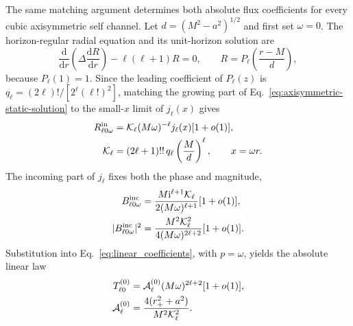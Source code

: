 \documentclass[aps,prd,twocolumn,10pt,nofootinbib,superscriptaddress,floatfix]{revtex4-2}
\newcommand{\dd}{\mathrm{d}}
\newcommand{\ii}{\mathrm{i}}
\newcommand{\DeltaK}{\Delta}
\begin{document}
The same matching argument determines both absolute flux coefficients for
every cubic axisymmetric self channel.  Let
$d=(M^2-a^2)^{1/2}$ and first set $\omega=0$.  The horizon-regular radial
equation and its unit-horizon solution are
\begin{equation}
 \frac{\dd}{\dd r}\left(\DeltaK\frac{\dd R}{\dd r}\right)
 -\ell(\ell+1)R=0,
 \qquad
 R=P_\ell\!\left(\frac{r-M}{d}\right),
 \label{eq:axisymmetric-static-solution}
\end{equation}
because $P_\ell(1)=1$.  Since the leading coefficient of $P_\ell(z)$ is
$q_\ell=(2\ell)!/[2^\ell(\ell!)^2]$, matching the growing part of
Eq.~\eqref{eq:axisymmetric-static-solution} to the small-$x$ limit of
$j_\ell(x)$ gives
\begin{align}
 R^{\rm in}_{\ell0\omega}
 &= {\cal K}_\ell(M\omega)^{-\ell}j_\ell(x)[1+o(1)],\nonumber\\
 {\cal K}_\ell
 &=(2\ell+1)!!\,q_\ell\left(\frac{M}{d}\right)^\ell,
 \qquad x=\omega r .
 \label{eq:axisymmetric-far-match}
\end{align}
The incoming part of $j_\ell$ fixes both the phase and magnitude,
\begin{align}
 B^{\rm inc}_{\ell0\omega}
 &=\frac{M\ii^{\ell+1}{\cal K}_\ell}
 {2(M\omega)^{\ell+1}}[1+o(1)],\nonumber\\
 |B^{\rm inc}_{\ell0\omega}|^2
 &=\frac{M^2{\cal K}_\ell^2}
 {4(M\omega)^{2\ell+2}}[1+o(1)].
 \label{eq:axisymmetric-binc-limit}
\end{align}
Substitution into Eq.~\eqref{eq:linear_coefficients}, with $p=\omega$, yields
the absolute linear law
\begin{align}
 T^{(0)}_{\ell0}
 &={\cal A}^{(0)}_\ell(M\omega)^{2\ell+2}[1+o(1)],\nonumber\\
 {\cal A}^{(0)}_\ell
 &=\frac{4(r_+^2+a^2)}{M^2{\cal K}_\ell^2}.
 \label{eq:axisymmetric-T0-infrared}
\end{align}
\end{document}
